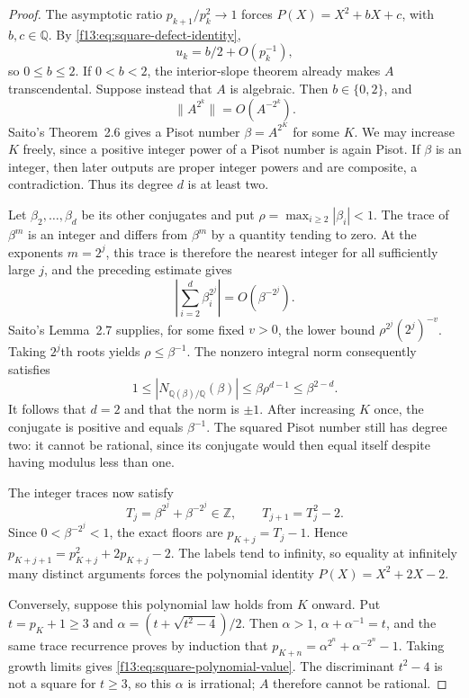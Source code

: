 \documentclass[11pt,a4paper]{article}
\theoremstyle{definition}
\theoremstyle{remark}
\numberwithin{equation}{section}
\begin{document}
\begin{proof}
The asymptotic ratio $p_{k+1}/p_k^2\to1$ forces
$P(X)=X^2+bX+c$, with $b,c\in\mathbb Q$. By
\eqref{f13:eq:square-defect-identity},
\[
 u_k=b/2+O(p_k^{-1}),
\]
so $0\le b\le2$. If $0<b<2$, the interior-slope theorem already
makes $A$ transcendental. Suppose instead that $A$ is algebraic.
Then $b\in\{0,2\}$, and
\[
 \|A^{2^k}\|=O(A^{-2^k}).
\]
Saito's Theorem~2.6 gives a Pisot number $\beta=A^{2^K}$ for some
$K$. We may increase $K$ freely, since a positive integer power of
a Pisot number is again Pisot. If $\beta$ is an integer, then later
outputs are proper integer powers and are composite, a contradiction.
Thus its degree $d$ is at least two.

Let $\beta_2,\ldots,\beta_d$ be its other conjugates and put
$\rho=\max_{i\ge2}|\beta_i|<1$. The trace of $\beta^m$ is an
integer and differs from $\beta^m$ by a quantity tending to zero.
At the exponents $m=2^j$, this trace is therefore the nearest integer
for all sufficiently large $j$, and the preceding estimate gives
\[
 \left|\sum_{i=2}^d\beta_i^{2^j}\right|=O(\beta^{-2^j}).
\]
Saito's Lemma~2.7 supplies, for some fixed $v>0$, the lower bound
$\rho^{2^j}(2^j)^{-v}$. Taking $2^j$th roots yields
$\rho\le\beta^{-1}$. The nonzero integral norm consequently satisfies
\[
 1\le |N_{\mathbb Q(\beta)/\mathbb Q}(\beta)|
    \le\beta\rho^{d-1}\le\beta^{2-d}.
\]
It follows that $d=2$ and that the norm is $\pm1$. After increasing
$K$ once, the conjugate is positive and equals $\beta^{-1}$.
The squared Pisot number still has degree two: it cannot be rational,
since its conjugate would then equal itself despite having modulus
less than one.

The integer traces now satisfy
\[
 T_j=\beta^{2^j}+\beta^{-2^j}\in\mathbb Z,\qquad
 T_{j+1}=T_j^2-2.
\]
Since $0<\beta^{-2^j}<1$, the exact floors are
$p_{K+j}=T_j-1$. Hence
$p_{K+j+1}=p_{K+j}^2+2p_{K+j}-2$.
The labels tend to infinity, so equality at infinitely many distinct
arguments forces the polynomial identity $P(X)=X^2+2X-2$.

Conversely, suppose this polynomial law holds from $K$ onward.  Put
$t=p_K+1\ge3$ and $\alpha=(t+\sqrt{t^2-4})/2$.
Then $\alpha>1$, $\alpha+\alpha^{-1}=t$, and the same trace
recurrence proves by induction that
$p_{K+n}=\alpha^{2^n}+\alpha^{-2^n}-1$.
Taking growth limits gives \eqref{f13:eq:square-polynomial-value}.
The discriminant $t^2-4$ is not a square for $t\ge3$, so this
$\alpha$ is irrational; $A$ therefore cannot be rational.
\end{proof}
\end{document}
